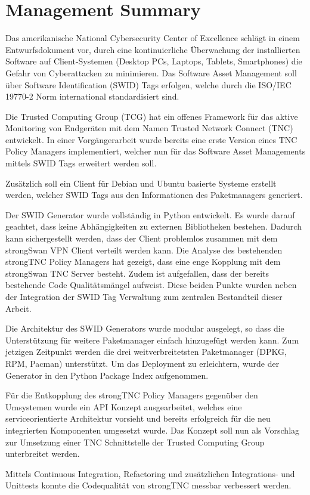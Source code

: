 \chapter{Management Summary}


Das amerikanische National Cybersecurity Center of Excellence schlägt in einem
Entwurfsdokument vor, durch eine kontinuierliche Überwachung der installierten
Software auf Client-Systemen (Desktop PCs, Laptops, Tablets, Smartphones) die
Gefahr von Cyberattacken zu minimieren. Das Software Asset Management soll über
Software Identification (SWID) Tags erfolgen, welche durch die ISO/IEC
19770-2\cite{iso19770-2} Norm international standardisiert sind.

Die Trusted Computing Group (TCG) hat ein offenes Framework für das aktive
Monitoring von Endgeräten mit dem Namen Trusted Network Connect (TNC)
entwickelt. In einer Vorgängerarbeit wurde bereits eine erste Version eines TNC
Policy Managers implementiert, welcher nun für das Software Asset Managements
mittels SWID Tags erweitert werden soll.

Zusätzlich soll ein Client für Debian und Ubuntu basierte Systeme erstellt
werden, welcher SWID Tags aus den Informationen des Paketmanagers generiert.


Der SWID Generator wurde vollständig in Python entwickelt. Es wurde darauf
geachtet, dass keine Abhängigkeiten zu externen Bibliotheken bestehen. Dadurch
kann sichergestellt werden, dass der Client problemlos zusammen mit dem
strongSwan VPN Client verteilt werden kann. Die Analyse des bestehenden
strongTNC Policy Managers hat gezeigt, dass eine enge Kopplung mit dem
strongSwan TNC Server besteht. Zudem ist aufgefallen, dass der bereits
bestehende Code Qualitätsmängel aufweist. Diese beiden Punkte wurden neben der
Integration der SWID Tag Verwaltung zum zentralen Bestandteil dieser Arbeit.\\


Die Architektur des SWID Generators wurde modular ausgelegt, so dass die
Unterstützung für weitere Paketmanager einfach hinzugefügt werden kann. Zum
jetzigen Zeitpunkt werden die drei weitverbreitetsten Paketmanager (DPKG,
RPM, Pacman) unterstützt. Um das Deployment zu erleichtern, wurde der Generator
in den Python Package Index aufgenommen.

Für die Entkopplung des strongTNC Policy Managers gegenüber den Umsystemen wurde
ein API Konzept ausgearbeitet, welches eine serviceorientierte Architektur
vorsieht und bereits erfolgreich für die neu integrierten Komponenten umgesetzt
wurde. Das Konzept soll nun als Vorschlag zur Umsetzung einer TNC Schnittstelle
der Trusted Computing Group unterbreitet werden.

Mittels Continuous Integration, Refactoring und zusätzlichen Integrations- und
Unittests konnte die Codequalität von strongTNC messbar verbessert werden.
